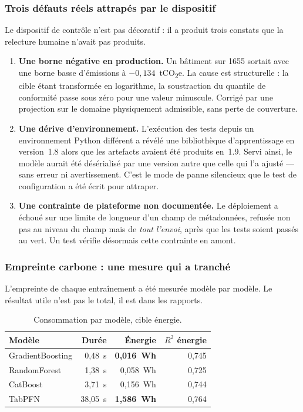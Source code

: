 \subsubsection*{Trois défauts réels attrapés par le dispositif}

Le dispositif de contrôle n'est pas décoratif : il a produit trois constats que
la relecture humaine n'avait pas produits.

\begin{enumerate}[leftmargin=1.6em,itemsep=0.45em]
  \item \textbf{Une borne négative en production.} Un bâtiment sur \num{1655}
        sortait avec une borne basse d'émissions à $-0{,}134$~tCO\textsubscript{2}e.
        La cause est structurelle : la cible étant transformée en logarithme, la
        soustraction du quantile de conformité passe sous zéro pour une valeur
        minuscule. Corrigé par une projection sur le domaine physiquement
        admissible, sans perte de couverture.
  \item \textbf{Une dérive d'environnement.} L'exécution des tests depuis un
        environnement Python différent a révélé une bibliothèque d'apprentissage
        en version~1.8 alors que les artefacts avaient été produits en~1.9.
        Servi ainsi, le modèle aurait été désérialisé par une version autre que
        celle qui l'a ajusté — sans erreur ni avertissement. C'est le mode de
        panne silencieux que le test de configuration a été écrit pour attraper.
  \item \textbf{Une contrainte de plateforme non documentée.} Le déploiement a
        échoué sur une limite de longueur d'un champ de métadonnées, refusée non
        pas au niveau du champ mais de \emph{tout l'envoi}, après que les tests
        soient passés au vert. Un test vérifie désormais cette contrainte en
        amont.
\end{enumerate}

\subsubsection{Empreinte carbone : une mesure qui a tranché}
\label{sec:carbone}

L'empreinte de chaque entraînement a été mesurée modèle par modèle. Le résultat
utile n'est pas le total, il est dans les rapports.

\begin{table}[H]
\centering
\small
\begin{tabular}{@{}lrrr@{}}
\toprule
\textbf{Modèle} & \textbf{Durée} & \textbf{Énergie} & \textbf{$R^2$ énergie} \\
\midrule
GradientBoosting & 0,48~s & \textbf{0,016~Wh} & 0,745 \\
RandomForest & 1,38~s & 0,058~Wh & 0,725 \\
CatBoost & 3,71~s & 0,156~Wh & 0,744 \\
TabPFN & 38,05~s & \textbf{1,586~Wh} & 0,764 \\
\bottomrule
\end{tabular}
\caption{Consommation par modèle, cible énergie.}
\end{table}

